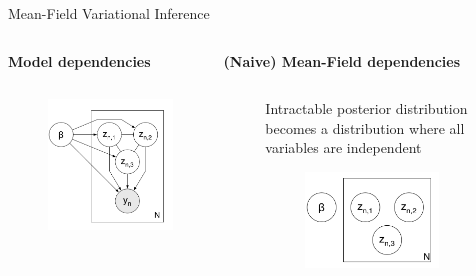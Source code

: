 \documentclass[aspectratio=169]{beamer}
\begin{document}
\begin{frame}{Mean-Field Variational Inference}
    
    \begin{columns}
    \begin{column}{0.48\textwidth}
        \centering
        \textbf{Model dependencies}
    \end{column}
    \begin{column}{0.48\textwidth}
        \centering
        \textbf{(Naive) Mean-Field dependencies}\\
    \end{column}
    \end{columns}
    
    \begin{columns}
    \begin{column}{0.48\textwidth}
        \begin{figure}
        \includegraphics[width=0.8\textwidth]{model_dep.png}\hspace*{12cm}
        \end{figure}
    \end{column}
    \begin{column}{0.48\textwidth}
        \centering
        Intractable posterior distribution becomes a distribution where all variables are independent
        \begin{figure}
        \includegraphics[width=0.8\textwidth]{mf.png}\hspace*{12cm}

\end{figure}
\end{column}
\end{columns}
\end{frame}
\end{document}
